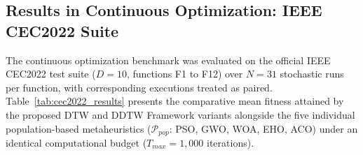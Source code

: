 

\subsection{Results in Continuous Optimization: IEEE CEC2022 Suite}
\label{sec:results_cec2022}

The continuous optimization benchmark was evaluated on the official IEEE CEC2022 test suite ($D=10$, functions F1 to F12) over $N=31$ stochastic runs per function, with corresponding executions treated as paired. Table~\ref{tab:cec2022_results} presents the comparative mean fitness attained by the proposed DTW and DDTW Framework variants alongside the five individual population-based metaheuristics ($\mathcal{P}_{pop}$: PSO, GWO, WOA, EHO, ACO) under an identical computational budget ($T_{max} = 1{,}000$ iterations).

